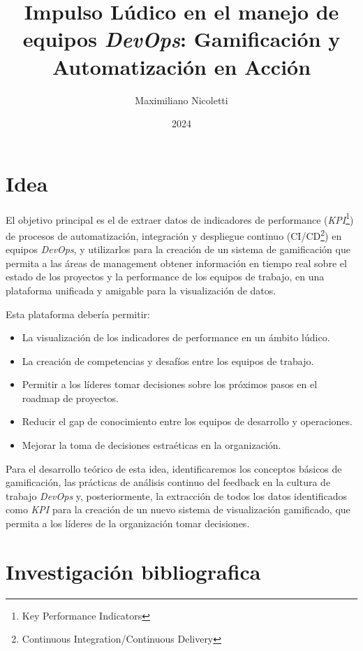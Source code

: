 \documentclass[journal]{IEEEtran}
\begin{document}
\title{Impulso Lúdico en el manejo de equipos \textit{DevOps}: Gamificación y Automatización en Acción}

\author{Maximiliano Nicoletti}

\date{2024}

\maketitle

\section{\textbf{\Large Idea}}

El objetivo principal es el de extraer datos de indicadores de performance (\textit{KPI}\footnote{Key Performance Indicators}) de procesos de automatización, integración y despliegue continuo (CI/CD\footnote{Continuous Integration/Continuous Delivery}) en equipos \textit{DevOps}, y utilizarlos para la creación de un sistema de gamificación que permita a las áreas de management obtener información en tiempo real sobre el estado de los proyectos y la performance de los equipos de trabajo, en una plataforma unificada y amigable para la visualización de datos.

Esta plataforma debería permitir:
\begin{itemize}
    \item La visualización de los indicadores de performance en un ámbito lúdico.
    \item La creación de competencias y desafíos entre los equipos de trabajo.
    \item Permitir a los líderes tomar decisiones sobre los próximos pasos en el roadmap de proyectos.
    \item Reducir el gap de conocimiento entre los equipos de desarrollo y operaciones.
    \item Mejorar la toma de decisiones estraéticas en la organización.
\end{itemize}

Para el desarrollo teórico de esta idea, identificaremos los conceptos básicos de gamificación, las prácticas de análisis continuo del feedback en la cultura de trabajo \textit{DevOps} y, posteriormente, la extracción de todos los datos identificados como \textit{KPI} para la creación de un nuevo sistema de visualización gamificado, que permita a los líderes de la organización tomar decisiones.

\section{\textbf{\Large Investigación bibliografica}}
\end{document}
